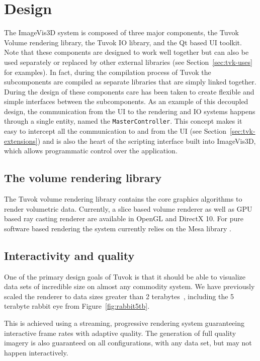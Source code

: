 \section{Design}
\label{sec:tvk-design}

The ImageVis3D system is composed of three major
components, the Tuvok Volume rendering library, the Tuvok IO
library, and the Qt based UI toolkit. Note that these
components are designed to work well together but can also be
used separately or replaced by other external libraries (see
Section~\ref{sec:tvk-uses} for examples). In fact, during the
compilation process of Tuvok the subcomponents are compiled as separate
libraries that are simply linked together. During the design of these
components care has been taken to create flexible and simple interfaces
between the subcomponents. As an example of this decoupled design,
the communication from the UI to the rendering and IO systems happens
through a single entity, named the \texttt{MasterController}. This concept makes
it easy to intercept all the communication to and from the
UI (see Section~\ref{sec:tvk-extensions}) and is also the heart of the
scripting interface built into ImageVis3D, which allows programmatic
control over the application.

\subsection{The volume rendering library}

The Tuvok volume rendering library contains the core graphics
algorithms to render volumetric data. Currently, a slice
based volume renderer as well as GPU based ray casting
renderer are available in OpenGL and DirectX 10. For pure
software based rendering the system currently relies on the
Mesa library \todo{[Pau]}.

\subsection{Interactivity and quality}

One of the primary design goals of Tuvok is that it should be able
to visualize data sets of incredible size on almost any commodity
system. We have previously scaled the renderer to
data sizes greater than 2 terabytes~\cite{Fogal:2010:HPG}, including
the 5
terabyte rabbit eye from Figure~\ref{fig:rabbit5tb}.

This is achieved using a streaming, progressive rendering
system guaranteeing interactive frame rates with adaptive
quality. The generation of full quality imagery is also
guaranteed on all configurations, with any data set, but may not
happen interactively.

